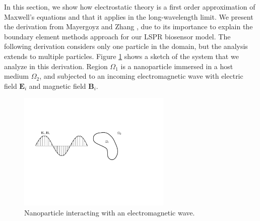 In this section, we show how electrostatic theory is a first order approximation of Maxwell's 
equations and that it applies in the long-wavelength limit. We present the derivation from 
Mayergoyz and Zhang \cite{MayergoyzZhang2007}, due to its importance to explain the boundary 
element methods approach for our LSPR biosensor model. The following derivation considers only one particle 
in the domain, but the analysis extends to multiple particles. Figure \ref{fig:part_wave} shows a 
sketch of the system that we analyze in this derivation. Region $\Omega_1$ is a nanoparticle 
immersed in a host medium $\Omega_2$, and subjected to an incoming electromagnetic wave with electric field 
$\mathbf{E}_i$ and magnetic field $\mathbf{B}_i$.

\begin{figure}[h] %
   \centering
   \includegraphics[width=0.65\textwidth]{particle_wave.pdf} 
   \caption{Nanoparticle interacting with an electromagnetic wave.}
   \label{fig:part_wave}
\end{figure}

